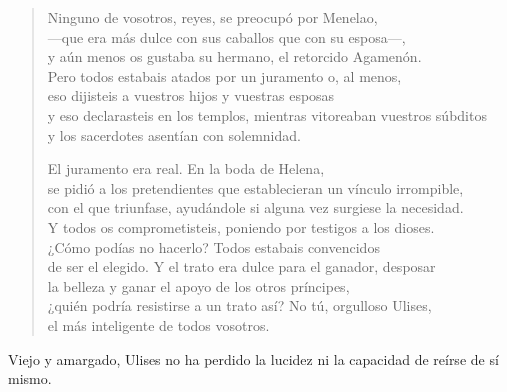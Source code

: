 \documentclass[11pt,a4paper]{article}
\begin{document}
\begin{verse}
Ninguno de vosotros, reyes, se preocupó por Menelao,\\
---que era más dulce con sus caballos que con su esposa---,\\
y aún menos os gustaba su hermano, el retorcido Agamenón.\\
Pero todos estabais atados por un juramento o, al menos,\\
eso dijisteis a vuestros hijos y vuestras esposas\\
y eso declarasteis en los templos, mientras vitoreaban vuestros súbditos\\
y los sacerdotes asentían con solemnidad.

El juramento era real. En la boda de Helena,\\
se pidió a los pretendientes que establecieran un vínculo irrompible,\\
con el que triunfase, ayudándole si alguna vez surgiese la necesidad.\\
Y todos os comprometisteis, poniendo por testigos a los dioses.\\
¿Cómo podías no hacerlo? Todos estabais convencidos\\
de ser el elegido. Y el trato era dulce para el ganador, desposar\\
la belleza y ganar el apoyo de los otros príncipes,\\
¿quién podría resistirse a un trato así? No tú, orgulloso Ulises,\\
el más inteligente de todos vosotros.
\end{verse}

Viejo y amargado, Ulises no ha perdido la lucidez ni la capacidad de reírse de sí mismo.
\end{document}
